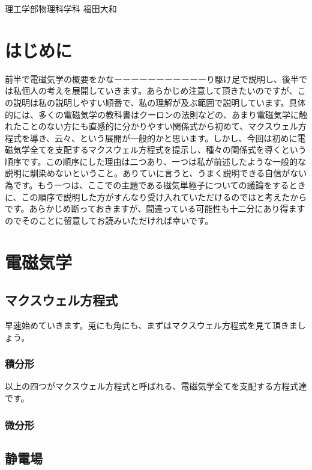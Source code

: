 \documentclass[10pt,b5paper,papersize,dvipdfmx]{jsbook}
\begin{document}

\kaishititle%
  {理工学部物理科学科}%
  {福田大和}%


\section{はじめに}
前半で電磁気学の概要をかなーーーーーーーーーーーり駆け足で説明し、後半では私個人の考えを展開していきます。あらかじめ注意して頂きたいのですが、この説明は私の説明しやすい順番で、私の理解が及ぶ範囲で説明しています。具体的には、多くの電磁気学の教科書はクーロンの法則などの、あまり電磁気学に触れたことのない方にも直感的に分かりやすい関係式から初めて、マクスウェル方程式を導き、云々、という展開が一般的かと思います。しかし、今回は初めに電磁気学全てを支配するマクスウェル方程式を提示し、種々の関係式を導くという順序です。この順序にした理由は二つあり、一つは私が前述したような一般的な説明に馴染めないということ。ありていに言うと、うまく説明できる自信がない為です。もう一つは、ここでの主題である磁気単極子についての議論をするときに、この順序で説明した方がすんなり受け入れていただけるのではと考えたからです。あらかじめ断っておきますが、間違っている可能性も十二分にあり得ますのでそのことに留意してお読みいただければ幸いです。

\section{電磁気学}
\subsection{マクスウェル方程式}
早速始めていきます。兎にも角にも、まずはマクスウェル方程式を見て頂きましょう。
\subsubsection{積分形}

以上の四つがマクスウェル方程式と呼ばれる、電磁気学全てを支配する方程式達です。

\subsubsection{微分形}

\subsection{静電場}
\end{document}
